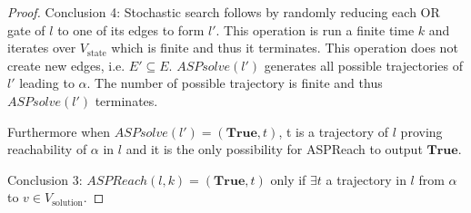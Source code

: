 \begin{theorem}
\begin{proof}
        Conclusion 4: Stochastic search follows by randomly reducing each OR gate of $l$ to one of its edges to form $l'$.
        This operation is run a finite time $k$ and iterates over $V_{\mathrm{state}}$ which is finite and thus it terminates.
        This operation does not create new edges, i.e. $E' \subseteq E$.
        $ASPsolve(l')$ generates all possible trajectories of $l'$ leading to $\alpha$.
        The number of possible trajectory is finite and thus $ASPsolve(l')$ terminates.
        
        
        
        Furthermore when $ASPsolve(l')=(\mathbf{True},t)$, t is a trajectory of $l$ proving reachability of $\alpha$ in $l$ and it is the only possibility for ASPReach to output $\mathbf{True}$.
        
        Conclusion 3: $ASPReach(l,k)=(\mathrm{\mathbf{True}},t)$ only if $\exists t$ a trajectory in $l$ from $\alpha$ to $v \in V_{\mathrm{solution}}$.
    \end{proof}
\end{theorem}

